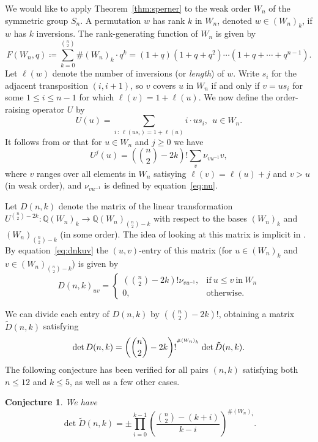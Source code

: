 \documentclass[12pt]{amsart}
\newtheorem{conj}[thm]{Conjecture}
\theoremstyle{definition}
\theoremstyle{remark}
\numberwithin{equation}{section}
\begin{document}
We would like to apply Theorem~\ref{thm:sperner} to the weak order
$W_n$ of the symmetric group $S_n$. A permutation $w$ has rank $k$ in
$W_n$, denoted $w\in (W_n)_k$, if $w$ has $k$ inversions. The
rank-generating function of $W_n$ is given by
 $$ F(W_n,q)\coloneqq \sum_{k=0}^{\binom n2}\#(W_n)_k\cdot q^k
      = (1+q)(1+q+q^2)\cdots (1+q+\cdots+q^{n-1}). $$
Let $\ell(w)$ denote the number of inversions (or \emph{length}) of
$w$. Write $s_i$ for the adjacent
transposition $(i,i+1)$, so $v$ covers $u$ in $W_n$ if and only if
$v=us_i$ for some $1\leq i\leq n-1$ for which $\ell(v)= 1+\ell(u)$. We
now define the order-raising operator $U$ by
 $$ U(u) =\sum_{i{\,:\,} \ell(us_i)=1+\ell(u)} i\cdot us_i,\ \ u\in
      W_n. $$ 
It follows from \cite[(6.11)]{macd} or \cite[Lemma~2.3]{f-s} that
for $u\in W_n$ and $j\geq 0$ we have
  \begin{equation} U^j(u) = \left(\binom n2-2k\right)!
   \sum_v \nu_{vu^{-1}}v, \label{eq:dnkuv} \end{equation}
where $v$ ranges over all elements in $W_n$ satisying $\ell(v) =
\ell(u) +j$ and $v>u$ (in weak order), and $\nu_{vu^{-1}}$ is defined
by equation~\eqref{eq:nu}.

Let $D(n,k)$ denote the matrix of the linear transformation
$U^{\binom n2-2k}\colon {\mathbb{Q}} (W_n)_k\to {\mathbb{Q}} (W_n)_{\binom n2-k}$ with respect
to the bases $(W_n)_k$ and $(W_n)_{\binom n2-k}$ (in some order). The
idea of looking at this matrix is implicit in \cite{rs:mo}. By
equation~\eqref{eq:dnkuv} the $(u,v)$-entry of this matrix (for $u\in
(W_n)_k$ and $v\in (W_n)_{\binom n2-k}$) is given by
   $$ D(n,k)_{uv}=\left\{ \begin{array}{rl}
     \left(\binom n2-2k\right)!\nu_{vu^{-1}}, & \mathrm{if}\ u\leq
     v\ \mathrm{in}\ W_n\\[.5em] 
     0, & \mathrm{otherwise}. \end{array} \right. $$

We can divide each entry of $D(n,k)$ by $\left(\binom n2-2k\right)!$,
obtaining a matrix $\tilde{D}(n,k)$ satisfying
  $$ \det D(n,k) = \left(\binom
       n2-2k\right)!^{^{^{\scriptsize\#(W_n)_k}}} \det 
    \tilde{D}(n,k). $$
The following conjecture has been verified for all pairs $(n,k)$
satisfying both $n\leq 12$ and $k\leq 5$, as well as a few other
cases.

\begin{conj} \label{conj:det}
  We have
  \begin{equation} \det \tilde{D}(n,k) = \pm\prod_{i=0}^{k-1}\left( \frac{\binom
    n2-(k+i)} {k-i}\right)^{\#(W_n)_i}. \label{eq:conj} \end{equation}
\end{conj}
\end{document}
